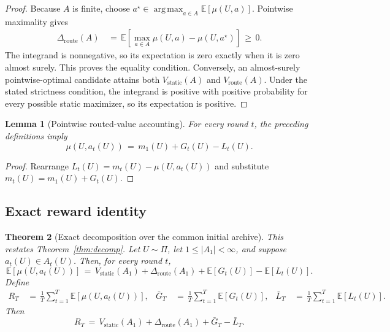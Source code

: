 \documentclass{article} %
\newtheorem{theorem}{Theorem}
\newtheorem{lemma}[theorem]{Lemma}
\begin{document}
\begin{proof}
Because \(A\) is finite, choose
\(a^\star\in\operatorname*{arg\,max}_{a\in A}
\mathbb E[\mu(U,a)]\).  Pointwise maximality gives
\begin{equation}
\begin{aligned}
\Delta_{\mathrm{route}}(A)
&\,=\,\mathbb E\!\left[
  \max_{a\in A}\mu(U,a)-\mu(U,a^\star)\right]
\,\geq\,0.
\end{aligned}
\end{equation}
The integrand is nonnegative, so its expectation is zero exactly when it is
zero almost surely.  This proves the equality condition.  Conversely, an
almost-surely pointwise-optimal candidate attains both
\(V_{\mathrm{static}}(A)\) and \(V_{\mathrm{route}}(A)\).  Under the stated
strictness condition, the integrand is positive with positive probability for
every possible static maximizer, so its expectation is positive.
\end{proof}

\begin{lemma}[Pointwise routed-value accounting]
\label{lem:2}
For every round \(t\), the preceding definitions imply
\begin{equation}
\mu(U,a_t(U))
\,=\,
m_1(U)+G_t(U)-L_t(U).
\end{equation}
\end{lemma}

\begin{proof}
Rearrange \(L_t(U)=m_t(U)-\mu(U,a_t(U))\) and substitute
\(m_t(U)=m_1(U)+G_t(U)\).
\end{proof}

\subsection{Exact reward identity}

\begin{theorem}[Exact decomposition over the common initial archive]
\label{thm:main}
This restates Theorem~\ref{thm:decomp}.  Let \(U\sim\Pi\), let
\(1\leq |A_1|<\infty\), and suppose \(a_t(U)\in A_t(U)\).  Then, for every
round \(t\),
\begin{equation}
\mathbb{E}[\mu(U,a_t(U))]
\,=\,
V_{\mathrm{static}}(A_1)
+
\Delta_{\mathrm{route}}(A_1)
+
\mathbb{E}[G_t(U)]
-
\mathbb{E}[L_t(U)].
\end{equation}
Define
\begin{equation}
\begin{aligned}
R_T
&\,=\,\frac1T\sum_{t=1}^T\mathbb E[\mu(U,a_t(U))], &
\bar G_T
&\,=\,\frac1T\sum_{t=1}^T\mathbb E[G_t(U)], &
\bar L_T
&\,=\,\frac1T\sum_{t=1}^T\mathbb E[L_t(U)].
\end{aligned}
\end{equation}
Then
\begin{equation}
\label{eq:app-decomp-bound}
R_T
\,=\,
V_{\mathrm{static}}(A_1)
+
\Delta_{\mathrm{route}}(A_1)
+
\bar G_T
-
\bar L_T.
\end{equation}
\end{theorem}
\end{document}

